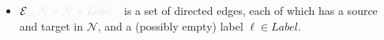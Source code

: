 \documentclass{article}
\newcommand{\notation}[2][]{#1}
\renewcommand{\notation}[2][]{{\color{notationcolor} #2}}
\newcommand{\N}{\mathcal N}
\newcommand{\Ed}{\mathcal E}
\newcommand{\MN}{PDG}
\numberwithin{equation}{section}
\begin{document}
\begin{notfocus}
\begin{defn}[\MN]
\begin{itemize}[nosep]
			\item $\Ed \notation{\subseteq \N \times \N \times \mathit{Label}}$~~is a set of directed edges, each of which has a source and target in $\N$, and a (possibly empty) label\notation{$\ell \in \mathit{Label}$}.

\end{itemize}
\end{defn}
\end{notfocus}
\end{document}
